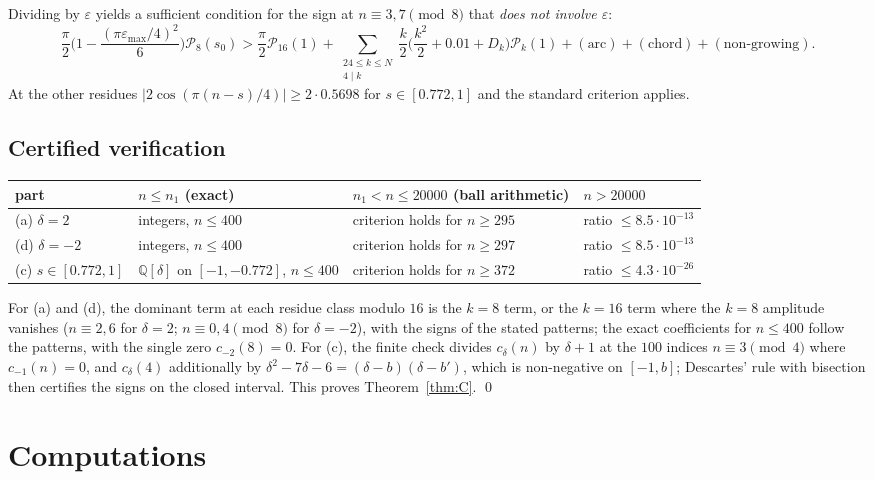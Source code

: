\documentclass[11pt]{amsart}
\theoremstyle{remark}
\theoremstyle{definition}
\newcommand{\Q}{\mathbb Q}
\newcommand{\cP}{\mathcal P}
\begin{document}
Dividing by $\varepsilon$ yields a sufficient condition for the sign at $n\equiv3,7\pmod8$ that \emph{does not involve $\varepsilon$}:
\[
\frac\pi2\Big(1-\frac{(\pi\varepsilon_{\max}/4)^2}6\Big)\cP_8(s_0)>\frac\pi2\cP_{16}(1)+\sum_{\substack{24\le k\le N\\4\mid k}}\frac k2\Big(\frac{k^2}2+0.01+D_k\Big)\cP_k(1)+(\text{arc})+(\text{chord})+(\text{non-growing}).
\]
At the other residues $|2\cos(\pi(n-s)/4)|\ge2\cdot0.5698$ for $s\in[0.772,1]$ and the standard criterion applies.

\subsection{Certified verification}
\begin{center}
\begin{tabular}{llll}
\toprule
part & $n\le n_1$ (exact) & $n_1<n\le20000$ (ball arithmetic) & $n>20000$\\
\midrule
(a) $\delta=2$ & integers, $n\le400$ & criterion holds for $n\ge295$ & ratio $\le8.5\cdot10^{-13}$\\
(d) $\delta=-2$ & integers, $n\le400$ & criterion holds for $n\ge297$ & ratio $\le8.5\cdot10^{-13}$\\
(c) $s\in[0.772,1]$ & $\Q[\delta]$ on $[-1,-0.772]$, $n\le400$ & criterion holds for $n\ge372$ & ratio $\le4.3\cdot10^{-26}$\\
\bottomrule
\end{tabular}
\end{center}
For (a) and (d), the dominant term at each residue class modulo $16$ is the $k=8$ term, or the $k=16$ term where the $k=8$ amplitude vanishes ($n\equiv2,6$ for $\delta=2$; $n\equiv0,4\pmod8$ for $\delta=-2$), with the signs of the stated patterns; the exact coefficients for $n\le400$ follow the patterns, with the single zero $c_{-2}(8)=0$. For (c), the finite check divides $c_\delta(n)$ by $\delta+1$ at the $100$ indices $n\equiv3\pmod4$ where $c_{-1}(n)=0$, and $c_\delta(4)$ additionally by $\delta^2-7\delta-6=(\delta-b)(\delta-b')$, which is non-negative on $[-1,b]$; Descartes' rule with bisection then certifies the signs on the closed interval. This proves Theorem~\ref{thm:C}. \qed

\section{Computations}\label{sec:computations}
\end{document}
